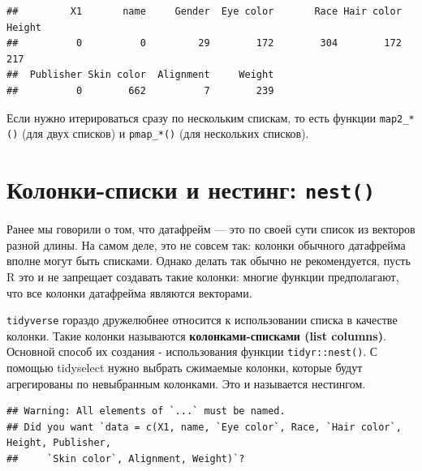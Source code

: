 \documentclass[]{book}
\newenvironment{Shaded}{\begin{snugshade}}{\end{snugshade}}
\newcommand{\KeywordTok}[1]{\textcolor[rgb]{0.13,0.29,0.53}{\textbf{#1}}}
\newcommand{\StringTok}[1]{\textcolor[rgb]{0.31,0.60,0.02}{#1}}
\newcommand{\OperatorTok}[1]{\textcolor[rgb]{0.81,0.36,0.00}{\textbf{#1}}}
\newcommand{\NormalTok}[1]{#1}
\begin{document}
\begin{Shaded}
\end{Shaded}

\begin{verbatim}
##         X1       name     Gender  Eye color       Race Hair color     Height 
##          0          0         29        172        304        172        217 
##  Publisher Skin color  Alignment     Weight 
##          0        662          7        239
\end{verbatim}

Если нужно итерироваться сразу по нескольким спискам, то есть функции
\texttt{map2\_*()} (для двух списков) и \texttt{pmap\_*()} (для
нескольких списков).

\section{\texorpdfstring{Колонки-списки и нестинг:
\texttt{nest()}}{Колонки-списки и нестинг: nest()}}\label{list_colums_nest}

Ранее мы говорили о том, что датафрейм --- это по своей сути список из
векторов разной длины. На самом деле, это не совсем так: колонки
обычного датафрейма вполне могут быть списками. Однако делать так обычно
не рекомендуется, пусть R это и не запрещает создавать такие колонки:
многие функции предполагают, что все колонки датафрейма являются
векторами.

\texttt{tidyverse} гораздо дружелюбнее относится к использовании списка
в качестве колонки. Такие колонки называются \textbf{колонками-списками
(list columns)}. Основной способ их создания - использования функции
\texttt{tidyr::nest()}. С помощью tidyselect нужно выбрать сжимаемые
колонки, которые будут агрегированы по невыбранным колонками. Это и
называется нестингом.

\begin{Shaded}
\end{Shaded}

\begin{verbatim}
## Warning: All elements of `...` must be named.
## Did you want `data = c(X1, name, `Eye color`, Race, `Hair color`, Height, Publisher, 
##     `Skin color`, Alignment, Weight)`?
\end{verbatim}
\end{document}
